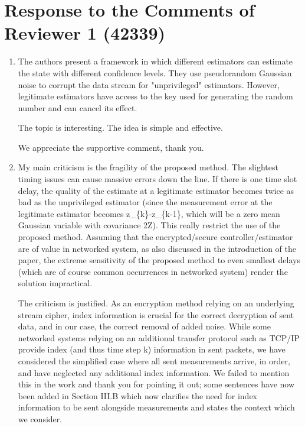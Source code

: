\documentclass[a4paper]{scrartcl}
\newenvironment{rebuttal}{\begin{enumerate}[label={\color{grey}\thesection.\arabic{enumi}},leftmargin=0pt,ref=\thesection.\arabic{enumi}]}{\end{enumerate}}
\newcommand{\reviewtext}[1]{{\color{nblue} #1}}
\begin{document}



\section*{Response to the Comments of Reviewer 1 (42339)}
\def\thesection{R1}
\begin{rebuttal}
\item \reviewtext{The authors present a framework in which different estimators can estimate the state with different confidence levels. They use pseudorandom Gaussian noise to corrupt the data stream for "unprivileged" estimators. However, legitimate estimators have access to the key used for generating the random number and can cancel its effect. 

The topic is interesting. The idea is simple and effective.}

We appreciate the supportive comment, thank you.

\item \reviewtext{My main criticism is the fragility of the proposed method. The slightest timing issues can cause massive errors down the line. If there is one time slot delay, the quality of the estimate at a legitimate estimator becomes twice as bad as the unprivileged estimator (since the measurement error at the legitimate estimator becomes z\_\{k\}-z\_\{k-1\}, which will be a zero mean Gaussian variable with covariance 2Z). This really restrict the use of the proposed method. Assuming that the encrypted/secure controller/estimator are of value in networked system, as also discussed in the introduction of the paper, the extreme sensitivity of the proposed method to even smallest delays (which are of course common occurrences in networked system) render the solution impractical.}

The criticism is justified. As an encryption method relying on an underlying stream cipher, index information is crucial for the correct decryption of sent data, and in our case, the correct removal of added noise. While some networked systems relying on an additional transfer protocol such as TCP/IP provide index (and thus time step k) information in sent packets, we have considered the simplified case where all sent measurements arrive, in order, and have neglected any additional index information. We failed to mention this in the work and thank you for pointing it out; some sentences have now been added in Section III.B which now clarifies the need for index information to be sent alongside measurements and states the context which we consider.


\end{rebuttal}
\end{document}
